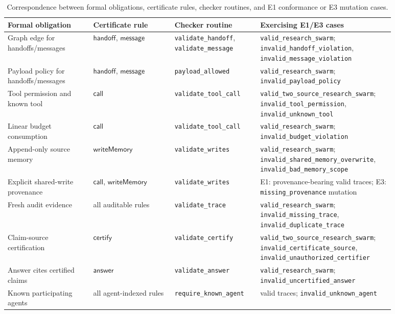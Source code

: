 \documentclass[a4paper,fleqn]{cas-sc}
\begin{document}
\begin{table}[htbp]
\centering
\scriptsize
\begin{tabular}{>{\raggedright\arraybackslash}p{0.20\linewidth}>{\raggedright\arraybackslash}p{0.19\linewidth}>{\raggedright\arraybackslash}p{0.20\linewidth}>{\raggedright\arraybackslash}p{0.29\linewidth}}
\toprule
Formal obligation & Certificate rule & Checker routine & Exercising E1/E3 cases \\
\midrule
Graph edge for handoffs/messages & \(\mathsf{handoff}\), \(\mathsf{message}\) & \texttt{validate\_handoff}, \texttt{validate\_message} & \texttt{valid\_research\_swarm}; \texttt{invalid\_handoff\_violation}, \texttt{invalid\_message\_violation} \\
Payload policy for handoffs/messages & \(\mathsf{handoff}\), \(\mathsf{message}\) & \texttt{payload\_allowed} & \texttt{valid\_research\_swarm}; \texttt{invalid\_payload\_policy} \\
Tool permission and known tool & \(\mathsf{call}\) & \texttt{validate\_tool\_call} & \texttt{valid\_two\_source\_research\_swarm}; \texttt{invalid\_tool\_permission}, \texttt{invalid\_unknown\_tool} \\
Linear budget consumption & \(\mathsf{call}\) & \texttt{validate\_tool\_call} & \texttt{valid\_research\_swarm}; \texttt{invalid\_budget\_violation} \\
Append-only source memory & \(\mathsf{writeMemory}\) & \texttt{validate\_writes} & \texttt{valid\_research\_swarm}; \texttt{invalid\_shared\_memory\_overwrite}, \texttt{invalid\_bad\_memory\_scope} \\
Explicit shared-write provenance & \(\mathsf{call}\), \(\mathsf{writeMemory}\) & \texttt{validate\_writes} & E1: provenance-bearing valid traces; E3: \texttt{missing\_provenance} mutation \\
Fresh audit evidence & all auditable rules & \texttt{validate\_trace} & \texttt{valid\_research\_swarm}; \texttt{invalid\_missing\_trace}, \texttt{invalid\_duplicate\_trace} \\
Claim-source certification & \(\mathsf{certify}\) & \texttt{validate\_certify} & \texttt{valid\_two\_source\_research\_swarm}; \texttt{invalid\_certificate\_source}, \texttt{invalid\_unauthorized\_certifier} \\
Answer cites certified claims & \(\mathsf{answer}\) & \texttt{validate\_answer} & \texttt{valid\_research\_swarm}; \texttt{invalid\_uncertified\_answer} \\
Known participating agents & all agent-indexed rules & \texttt{require\_known\_agent} & valid traces; \texttt{invalid\_unknown\_agent} \\
\bottomrule
\end{tabular}
\caption{Correspondence between formal obligations, certificate rules, checker routines, and E1 conformance or E3 mutation cases.}
\label{tab:obligation-checker-map}
\end{table}
\end{document}
